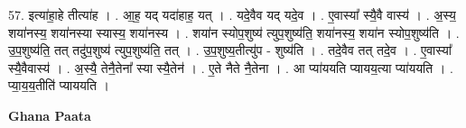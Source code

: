 \documentclass[17pt]{extarticle}
\begin{document}
57. इत्या॑हा॒हे तीत्या॑ह । . आ॒ह॒ यद् यदा॑हाह॒ यत् । . यदे॒वैव यद् यदे॒व । . ए॒वास्या᳚ स्यै॒वै वास्य॑ । . अ॒स्य॒ शया॑नस्य॒ शया॑नस्या स्यास्य॒ शया॑नस्य । . शया॑न स्योप॒शुष्य॑ त्युप॒शुष्य॑ति॒ शया॑नस्य॒ शया॑न स्योप॒शुष्य॑ति । . उ॒प॒शुष्य॑ति॒ तत् तदु॑प॒शुष्य॑ त्युप॒शुष्य॑ति॒ तत् । . उ॒प॒शुष्य॒तीत्यु॑प - शुष्य॑ति । . तदे॒वैव तत् तदे॒व । . ए॒वास्या᳚ स्यै॒वैवास्य॑ । . अ॒स्यै॒ तेनै॒तेना᳚ स्या स्यै॒तेन॑ । . ए॒ते नैते नै॒तेना । . आ प्या॑ययति प्यायय॒त्या प्या॑ययति । . प्या॒य॒य॒तीति॑ प्याययति । \newline

\textbf{Ghana Paata } \newline
\end{document}

